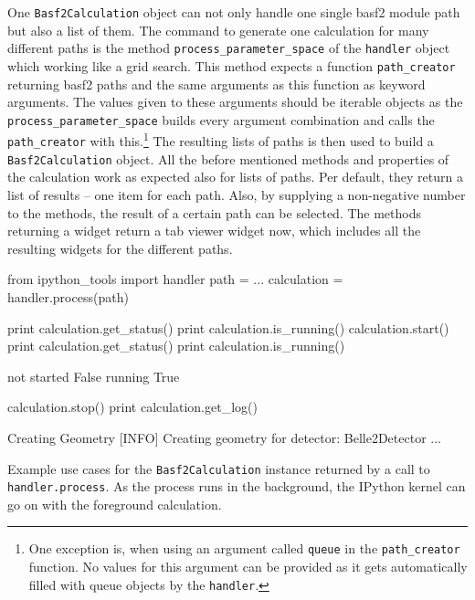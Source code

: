 One \texttt{Basf2Calculation} object can not only handle one single basf2 module path but also a list of them. The command to generate one calculation for many different paths is the method \verb+process_parameter_space+ of the \texttt{handler} object which working like a grid search. This method expects a function \verb+path_creator+ returning basf2 paths and the same arguments as this function as keyword arguments. The values given to these arguments should be iterable objects as the \verb+process_parameter_space+ builds every argument combination and calls the \verb+path_creator+ with this.\footnote{One exception is, when using an argument called \texttt{queue} in the \texttt{path\_creator} function. No values for this argument can be provided as it gets automatically filled with queue objects by the \texttt{handler}.} The resulting lists of paths is then used to build a \texttt{Basf2Calculation} object. All the before mentioned methods and properties of the calculation work as expected also for lists of paths. Per default, they return a list of results -- one item for each path. Also, by supplying a non-negative number to the methods, the result of a certain path can be selected. The methods returning a widget return a tab viewer widget now, which includes all the resulting widgets for the different paths.

\begin{listing}
\begin{inputipynb}
from ipython_tools import handler
path = ...
calculation = handler.process(path)
\end{inputipynb}
\begin{inputipynb}
print calculation.get_status()
print calculation.is_running()
calculation.start()
print calculation.get_status()
print calculation.is_running()
\end{inputipynb}
\begin{outputipynb}
not started
False
running
True
\end{outputipynb}
\begin{inputipynb}
calculation.stop()
print calculation.get_log()
\end{inputipynb}
\begin{outputipynb}[\theipythcntr]
[INFO] Creating Geometry
[INFO] Creating geometry for detector: Belle2Detector
...
\end{outputipynb}

  \caption[Example use cases for the Basf2Calculation objects.]{Example use cases for the \texttt{Basf2Calculation} instance returned by a call to \texttt{handler.process}. As the process runs in the background, the IPython kernel can go on with the foreground calculation.}
  \label{lis-calculation}
\end{listing}

